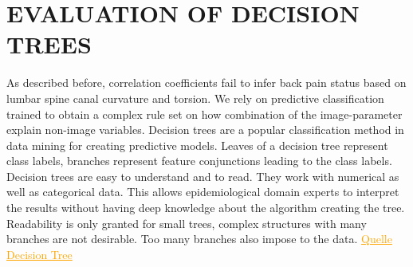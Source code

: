 \documentclass[a4paper,twoside]{style/article}
\newcommand{\com}[1]{\textcolor{orange}{\uline{#1}}}
\begin{document}
%


\section{\uppercase{Evaluation of Decision Trees}}
\label{sec:DecisionTrees}
\noindent As described before, correlation coefficients fail to infer back pain status based on lumbar spine canal curvature and torsion.
We rely on predictive classification trained to obtain a complex rule set on how combination of the image-parameter explain non-image variables.
Decision trees are a popular classification method in data mining for creating predictive models.
Leaves of a decision tree represent class labels, branches represent feature conjunctions leading to the class labels.
Decision trees are easy to understand and to read.
They work with numerical as well as categorical data.
This allows epidemiological domain experts to interpret the results without having deep knowledge about the algorithm creating the tree.
Readability is only granted for small trees, complex structures with many branches are not desirable.
Too many branches also impose to the data.
\com{Quelle Decision Tree}
\end{document}
